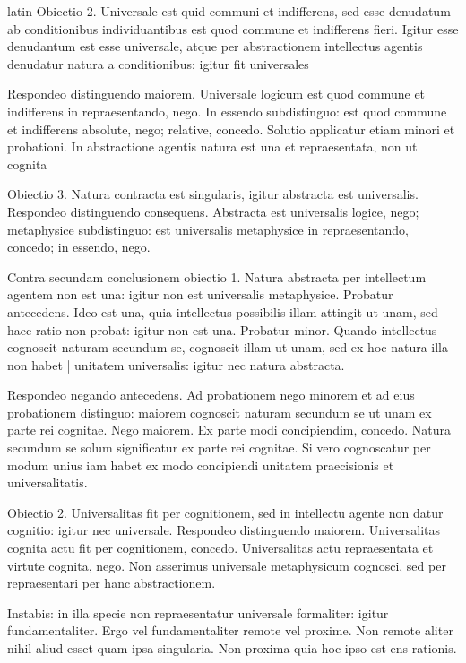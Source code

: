 \begin{otherlanguage*}{latin}
\pstart
Obiectio 2. Universale est quid communi et indifferens, sed esse denudatum ab conditionibus individuantibus est quod commune et indifferens fieri. Igitur esse denudantum est esse universale, atque per abstractionem intellectus agentis denudatur natura a conditionibus:
igitur fit universales 
\pend

\pstart
Respondeo distinguendo maiorem. Universale logicum est quod commune et indifferens in repraesentando, nego. In essendo subdistinguo:
est quod commune et indifferens absolute, nego; relative, concedo. Solutio applicatur etiam minori et probationi. In abstractione agentis natura est una et repraesentata, non ut cognita 
\pend

\pstart
Obiectio 3. Natura contracta est singularis, igitur abstracta est universalis. Respondeo distinguendo consequens. Abstracta est universalis logice, nego; metaphysice subdistinguo:
est universalis metaphysice in repraesentando, concedo; in essendo, nego. 
\pend

\pstart
Contra secundam conclusionem obiectio 1. Natura abstracta per intellectum agentem non est una:
igitur non est universalis metaphysice. Probatur antecedens. Ideo est una, quia intellectus possibilis illam attingit ut unam, sed haec ratio non probat:
igitur non est una. Probatur minor. Quando intellectus cognoscit naturam secundum se, cognoscit illam ut unam, sed ex hoc natura illa non habet \textnormal{|} unitatem universalis:
igitur nec natura abstracta. 
\pend

\pstart
Respondeo negando antecedens. Ad probationem nego minorem et ad eius probationem distinguo:
maiorem cognoscit naturam secundum se ut unam ex parte rei cognitae. Nego maiorem. Ex parte modi concipiendim, concedo. Natura secundum se solum significatur ex parte rei cognitae. Si vero cognoscatur per modum unius iam habet ex modo concipiendi unitatem praecisionis et universalitatis. 
\pend

\pstart
Obiectio 2. Universalitas fit per cognitionem, sed in intellectu agente non datur cognitio:
igitur nec universale. Respondeo distinguendo maiorem. Universalitas cognita actu fit per cognitionem, concedo. Universalitas actu repraesentata et virtute cognita, nego. Non asserimus universale metaphysicum cognosci, sed per repraesentari per hanc abstractionem. 
\pend

\pstart
Instabis:
in illa specie non repraesentatur universale formaliter:
igitur fundamentaliter. Ergo vel fundamentaliter remote vel proxime. Non remote aliter nihil aliud esset quam ipsa singularia. Non proxima quia hoc ipso est ens rationis. 
\pend


\end{otherlanguage*}
